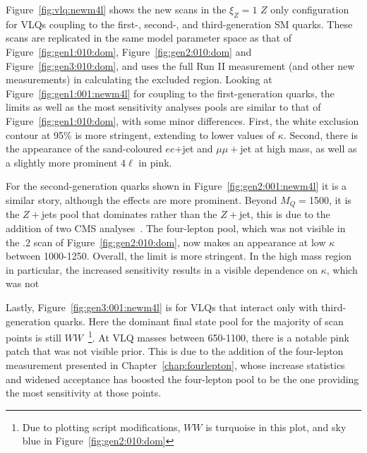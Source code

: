 Figure~\ref{fig:vlq:newm4l} shows the new \contur scans in the $\xi_Z=1$ $Z$ only configuration for VLQs coupling to the first-, second-, and third-generation SM quarks. These scans are replicated in the same model parameter space as that of Figure~\ref{fig:gen1:010:dom}, Figure~\ref{fig:gen2:010:dom} and Figure~\ref{fig:gen3:010:dom}, and uses the \ATLAS full Run II \mFourL{} measurement (and other new measurements) in calculating the excluded region. Looking at Figure~\ref{fig:gen1:001:newm4l} for coupling to the first-generation quarks, the limits as well as the most sensitivity analyses pools are similar to that of Figure~\ref{fig:gen1:010:dom}, with some minor differences. First, the white exclusion contour at 95\% is more stringent, extending to lower values of $\kappa$. Second, there is the appearance of the sand-coloured \CMS $ee$+jet and \CMS $\mu\mu+$jet at high mass, as well as a slightly more prominent \ATLAS $4\ell$ in pink. 

For the second-generation quarks shown in Figure~\ref{fig:gen2:001:newm4l} it is a similar story, although the effects are more prominent. Beyond $M_Q=$\unit{1500}{\GeV}, it is the \CMS $Z+$jets pool that dominates rather than the \ATLAS $Z+$jet, this is due to the addition of two CMS analyses~\cite{Sirunyan:2019bzr,Sirunyan:2018cpw}. The four-lepton pool, which was not visible in the .2 scan of Figure~\ref{fig:gen2:010:dom}, now makes an appearance at low $\kappa$ between \unit{1000}{\GeV}-\unit{1250}{\GeV}. Overall, the \contur limit is more stringent. In the high mass region in particular, the increased sensitivity results in a visible dependence on $\kappa$, which was not 

Lastly, Figure~\ref{fig:gen3:001:newm4l} is for VLQs that interact only with third-generation quarks. Here the dominant final state pool for the majority of scan points is still \ATLAS $WW$~\footnote{Due to plotting script modifications, \ATLAS $WW$ is turquoise in this plot, and sky blue in Figure~\ref{fig:gen2:010:dom}}. At VLQ masses between \unit{650}{\GeV}-\unit{1100}{\GeV}, there is a notable pink patch that was not visible prior. This is due to the addition of the four-lepton measurement presented in Chapter~\ref{chap:fourlepton}, whose increase statistics and widened acceptance has boosted the four-lepton pool to be the one providing the most sensitivity at those points. 

